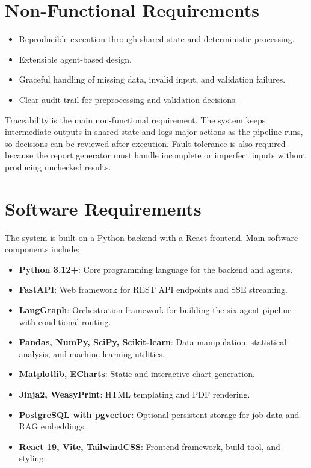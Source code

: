 \documentclass[12pt,a4paper,openany]{report}
\begin{document}
\section{Non-Functional Requirements}
\begin{itemize}
		\item Reproducible execution through shared state and deterministic processing.
		\item Extensible agent-based design.
		\item Graceful handling of missing data, invalid input, and validation failures.
		\item Clear audit trail for preprocessing and validation decisions.
\end{itemize}

Traceability is the main non-functional requirement. The system keeps intermediate outputs in shared state and logs major actions as the pipeline runs, so decisions can be reviewed after execution. Fault tolerance is also required because the report generator must handle incomplete or imperfect inputs without producing unchecked results.

\section{Software Requirements}
The system is built on a Python backend with a React frontend. Main software components include:

\begin{itemize}
	\item \textbf{Python 3.12+}: Core programming language for the backend and agents.
	\item \textbf{FastAPI}: Web framework for REST API endpoints and SSE streaming.
	\item \textbf{LangGraph}: Orchestration framework for building the six-agent pipeline with conditional routing.
	\item \textbf{Pandas, NumPy, SciPy, Scikit-learn}: Data manipulation, statistical analysis, and machine learning utilities.
	\item \textbf{Matplotlib, ECharts}: Static and interactive chart generation.
	\item \textbf{Jinja2, WeasyPrint}: HTML templating and PDF rendering.
	\item \textbf{PostgreSQL with pgvector}: Optional persistent storage for job data and RAG embeddings.
	\item \textbf{React 19, Vite, TailwindCSS}: Frontend framework, build tool, and styling.
\end{itemize}
\end{document}
